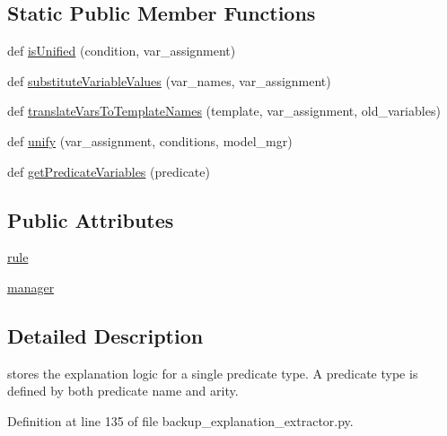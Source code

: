 \subsection*{Static Public Member Functions}
\begin{DoxyCompactItemize}
\item 
def \hyperlink{classbackup__explanation__extractor_1_1_explanation_template_a02531a40b21d06449441dd38b0b687f0}{is\+Unified} (condition, var\+\_\+assignment)
\item 
def \hyperlink{classbackup__explanation__extractor_1_1_explanation_template_ab7d8b1ccb577ddccb1753c1939fb0dfc}{substitute\+Variable\+Values} (var\+\_\+names, var\+\_\+assignment)
\item 
def \hyperlink{classbackup__explanation__extractor_1_1_explanation_template_a5da5f79a2b74d1dd42841381fcbab16b}{translate\+Vars\+To\+Template\+Names} (template, var\+\_\+assignment, old\+\_\+variables)
\item 
def \hyperlink{classbackup__explanation__extractor_1_1_explanation_template_acd03764adbc028db20e879b6bf6e9db0}{unify} (var\+\_\+assignment, conditions, model\+\_\+mgr)
\item 
def \hyperlink{classbackup__explanation__extractor_1_1_explanation_template_ad7bb0cb3a278fc21d562506e196e20a1}{get\+Predicate\+Variables} (predicate)
\end{DoxyCompactItemize}
\subsection*{Public Attributes}
\begin{DoxyCompactItemize}
\item 
\hyperlink{classbackup__explanation__extractor_1_1_explanation_template_a2af6ecb7ac9890bc38f063369c1dd966}{rule}
\item 
\hyperlink{classbackup__explanation__extractor_1_1_explanation_template_a210493351b1a5da793855d40db5495d1}{manager}
\end{DoxyCompactItemize}


\subsection{Detailed Description}
\begin{DoxyVerb}stores the explanation logic for a single predicate type. A predicate type
is defined by both predicate name and arity.\end{DoxyVerb}
 

Definition at line 135 of file backup\+\_\+explanation\+\_\+extractor.\+py.



